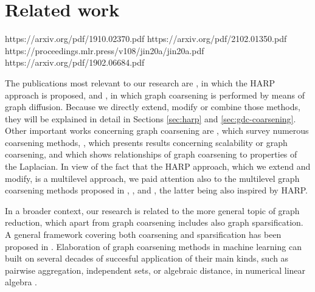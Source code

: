 \section{Related work}

https://arxiv.org/pdf/1910.02370.pdf
https://arxiv.org/pdf/2102.01350.pdf
https://proceedings.mlr.press/v108/jin20a/jin20a.pdf
https://arxiv.org/pdf/1902.06684.pdf

The publications most relevant to our research are \cite{chen_harp_2018}, in which the HARP approach is proposed, and \cite{gasteiger_diffusion_2019}, in which graph coarsening is performed by means of graph diffusion. Because we directly extend, modify or combine those methods, they will be explained in detail in Sections \ref{sec:harp} and \ref{sec:gdc-coarsening}. Other important works concerning graph coarsening are \cite{akyildiz_understanding_2020, chen_graph_2022}, which survey numerous coarsening methods, \cite{huang_scaling_2021}, which presents results concerning scalability or graph coarsening, and \cite{loukas_graph_2019} which shows relationships of graph coarsening to properties of the Laplacian. In view of the fact that the HARP approach, which we extend and modify, is a multilevel approach, we paid attention also to the multilevel graph coarsening methods proposed in \cite{xie_graph_2020}, \cite{deng_graphzoom_2020}, \cite{cai_graph_2022} and \cite{zhang_harp_2021}, the latter being also inspired by HARP.

In a broader context, our research is related to the more general topic of graph reduction, which apart from graph coarsening includes also graph sparsification. A general framework covering both coarsening and sparsification has been proposed in \cite{bravo_hermsdorff_unifying_2019}. Elaboration of graph coarsening methods in machine learning can built on several decades of succesful application of their main kinds, such as pairwise aggregation, independent sets, or algebraic distance, in numerical linear algebra \cite{chen_graph_2022}.
